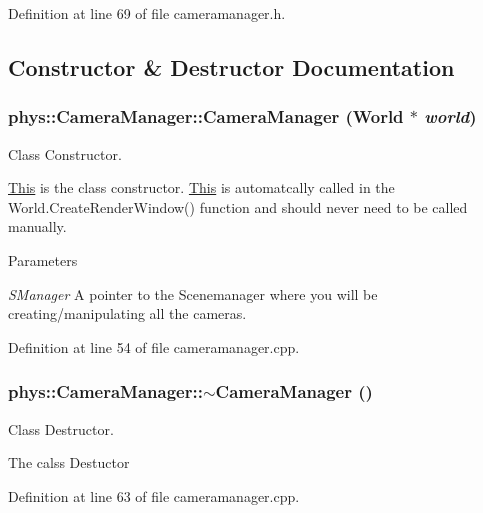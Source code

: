 Definition at line 69 of file cameramanager.h.



\subsection{Constructor \& Destructor Documentation}
\hypertarget{classphys_1_1CameraManager_a22d9c117e4f7f7e8d043a9d13070391c}{
\subsubsection[{CameraManager}]{\setlength{\rightskip}{0pt plus 5cm}phys::CameraManager::CameraManager ({\bf World} $\ast$ {\em world})}}
\label{d9/d91/classphys_1_1CameraManager_a22d9c117e4f7f7e8d043a9d13070391c}


Class Constructor. 

\hyperlink{structThis}{This} is the class constructor. \hyperlink{structThis}{This} is automatcally called in the World.CreateRenderWindow() function and should never need to be called manually. 
\begin{DoxyParams}{Parameters}
\item[{\em SManager}]A pointer to the Scenemanager where you will be creating/manipulating all the cameras. \end{DoxyParams}


Definition at line 54 of file cameramanager.cpp.

\hypertarget{classphys_1_1CameraManager_a0b0f032477309eb47b0302fd5eef198c}{
\subsubsection[{$\sim$CameraManager}]{\setlength{\rightskip}{0pt plus 5cm}phys::CameraManager::$\sim$CameraManager ()}}
\label{d9/d91/classphys_1_1CameraManager_a0b0f032477309eb47b0302fd5eef198c}


Class Destructor. 

The calss Destuctor 

Definition at line 63 of file cameramanager.cpp.




